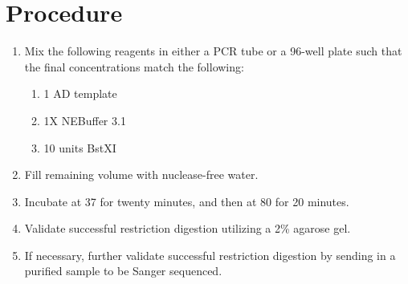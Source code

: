 \documentclass{ssiBio}
\begin{document}
\section{Procedure}
\begin{enumerate}
  \item{Mix the following reagents in either a PCR tube or a 96-well plate such that the final concentrations match the following:}
  \begin{enumerate}
    \item{1\ug{} AD template}
    \item{1X NEBuffer 3.1}
    \item{10 units BstXI}
  \end{enumerate}
  \item{Fill remaining volume with nuclease-free water.}
  \item{Incubate at 37\C{} for twenty minutes, and then at 80\C{} for 20 minutes.}
  \stopPoint
  \item{Validate successful restriction digestion utilizing a 2\% agarose gel.}
  \item{If necessary, further validate successful restriction digestion by sending in a purified sample to be Sanger sequenced.}
\end{enumerate}



\end{document}
